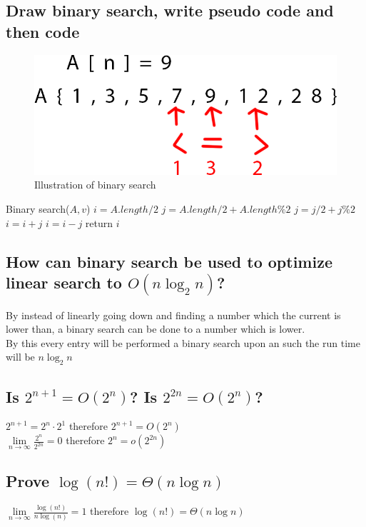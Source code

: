 \documentclass[12pt, a4paper]{article}
\begin{document}
			\subsection{Draw binary search, write pseudo code and then code}
				\begin{figure}[h!]
					\includegraphics[width=\linewidth]{assets/week6Exercise8.png}
					\caption{Illustration of binary search}
				\end{figure}
				\begin{algorithmic}[1]
					\State Binary search($A,v$)
					\State $i=A.length/2$
					\State $j = A.length/2 + A.length\%2$
						\State $j = j/2 + j\%2$
							\State $i = i + j$
						\Else
							\State $i = i - j$
						\EndIf
					\EndWhile
					\State return $i$
				\end{algorithmic}
			\subsection{How can binary search be used to optimize linear search to $O(n\log_2n)$?}
				By instead of linearly going down and finding a number which the current is lower than, a binary search can be done to a number which is lower.\\
				By this every entry will be performed a binary search upon an such the run time will be $n\log_2n$
			\subsection{Is $2^{n+1}=O(2^n)$? Is $2^{2n}=O(2^n)$?}
				$2^{n+1}=2^n\cdot 2^1$ therefore $2^{n+1}=O(2^n)$\\	
				$\lim\limits_{n\rightarrow \infty}\frac{2^n}{2^{2n}}=0$ therefore $2^n=o(2^{2n})$
			\subsection{Prove $\log(n!)=\Theta(n\log n)$}
				$\lim\limits_{n\rightarrow \infty}\frac{\log(n!)}{n\log(n)}=1$ therefore $\log(n!)=\Theta(n\log n)$
\end{document}
